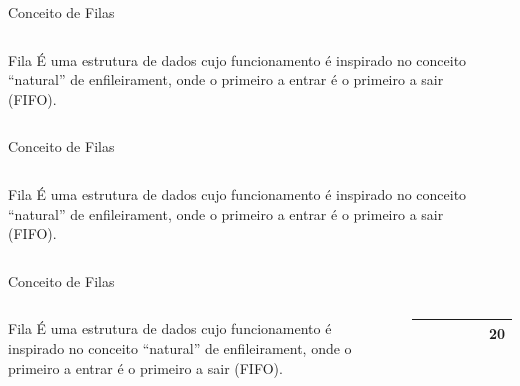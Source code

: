 \documentclass[12pt,table,xcolor={dvipsnames}]{beamer}
\begin{document}
\begin{frame}{Conceito de Filas}
\begin{columns}
\begin{block}{Fila}
É uma estrutura de dados cujo funcionamento é inspirado no conceito “natural” de enfileirament, onde o primeiro a entrar é o primeiro a sair (FIFO).
\end{block}
\begin{center}
\end{center}
\end{columns}
\end{frame}

\begin{frame}{Conceito de Filas}
\begin{columns}
\begin{block}{Fila}
É uma estrutura de dados cujo funcionamento é inspirado no conceito “natural” de enfileirament, onde o primeiro a entrar é o primeiro a sair (FIFO).
\end{block}
\begin{center}
{
\begin{tabular}{ |p{.5cm}|p{.5cm}|p{.5cm}|p{.5cm}|p{.5cm}|p{.5cm}| }
\hline
 & & & & &\\ \hline
\end{tabular}
}
\end{center}
\end{columns}
\end{frame}

\begin{frame}{Conceito de Filas}
\begin{columns}
\begin{block}{Fila}
É uma estrutura de dados cujo funcionamento é inspirado no conceito “natural” de enfileirament, onde o primeiro a entrar é o primeiro a sair (FIFO).
\end{block}
\begin{center}
{
\begin{tabular}{ |p{.5cm}|p{.5cm}|p{.5cm}|p{.5cm}|p{.5cm}|p{.5cm}| }
\hline
 &  &  &  &  & 20 \\ \hline
\end{tabular}
}
\end{center}
\end{columns}
\end{frame}
\end{document}
